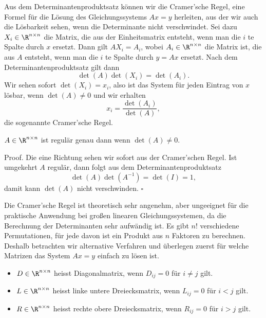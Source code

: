 \documentclass[letterpaper,10pt,english]{jupyterBook}
\begin{document}
Aus dem Determinantenproduktsatz können wir die Cramer’sche Regel, eine Formel für die Lösung des Gleichungssystems \(Ax=y\) herleiten, aus der wir auch die Lösbarkeit sehen, wenn die Determinante nicht verschwindet. Sei dazu \(X_i \in \R^{n \times n}\) die Matrix, die aus der Einheitsmatrix entsteht, wenn man die \(i\) te Spalte durch \(x\) ersetzt. Dann gilt \(A X_i = A_i\), wobei \(A_i \in \R^{n \times n}\) die Matrix ist, die aus \(A\) entsteht, wenn man die \(i\) te Spalte durch \(y=Ax\) ersetzt.  Nach dem Determinantenproduktsatz gilt dann
\begin{equation*}
 \det(A) \det(X_i) = \det(A_i).
\end{equation*}
Wir sehen sofort \(\det(X_i)=x_i\), also ist das System für jeden Eintrag von \(x\) lösbar, wenn \(\det(A)\neq 0\) und wir erhalten
\begin{equation*}
 x_i = \frac{\det(A_i)}{\det(A)},
\end{equation*}
die sogenannte Cramer’sche Regel.
\label{vektorraeume/LGS:theorem-18}
\begin{theorem}{}{}



\(A \in \R^{n \times n}\) ist regulär genau dann wenn \(\det(A)\neq 0\).
\end{theorem}

\begin{emphBox}{}{}
Proof. Die eine Richtung sehen wir sofort aus der Cramer’schen Regel. Ist umgekehrt \(A\) regulär, dann folgt aus dem Determinantenproduktsatz
\begin{equation*}
 \det(A) \det(A^{-1}) = \det(I) = 1,
\end{equation*}
damit kann \(\det(A)\) nicht verschwinden. \(\square\)
\end{emphBox}

Die Cramer’sche Regel ist theoretisch sehr angenehm, aber ungeeignet für die praktische Anwendung bei großen linearen Gleichungssystemen, da die Berechnung der Determinanten sehr aufwändig ist. Es gibt \(n!\) verschiedene Permutationen, für jede davon ist ein Produkt aus \(n \) Faktoren zu berechnen. Deshalb betrachten wir alternative Verfahren und überlegen zuerst für welche Matrizen das System \(Ax=y\) einfach zu lösen ist.
\label{vektorraeume/LGS:definition-19}
\begin{definition}{}{}


\begin{itemize}
\item {} 
\(D \in \R^{n \times n}\) heisst Diagonalmatrix, wenn \(D_{ij} =0 \) für \(i \neq j\) gilt.

\item {} 
\(L \in \R^{n \times n}\) heisst linke untere Dreiecksmatrix, wenn \(L_{ij} =0 \) für \(i < j\) gilt.

\item {} 
\(R \in \R^{n \times n}\) heisst rechte obere Dreiecksmatrix, wenn \(R_{ij} =0 \) für \(i > j\) gilt.

\end{itemize}
\end{definition}
\end{document}
